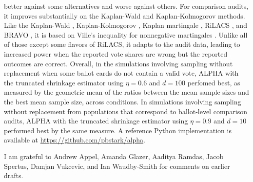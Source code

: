 \documentclass[aoas]{imsart}
\begin{document}
better against some alternatives and worse against others.
For comparison audits, it improves substantially on the Kaplan-Wald and Kaplan-Kolmogorov methods.
Like the Kaplan-Wald \citep{stark09b,stark20}, Kaplan-Kolmogorov \citep{stark20}, Kaplan martingale \citep{starkEvans19,stark20}, 
RiLACS \citep{waudby-smithEtal21}, and BRAVO \citep{lindemanEtal12}, it is based on Ville's inequality for nonnegative martingales \citep{ville39}.
Unlike all of those except some flavors of RiLACS, it adapts to the audit data, leading to increased power when the reported vote shares
are wrong but the reported outcomes are correct.
Overall, in the simulations involving sampling without replacement when some ballot cards do not contain a valid
vote, ALPHA with the truncated shrinkage estimator using $\eta=0.6$ and $d=100$ perfomed best, as measured by the
geometric mean of the ratios between the mean sample sizes and the best mean sample size, across conditions.
In simulations involving sampling without replacement from populations that correspond to ballot-level comparison audits,
ALPHA with the truncated shrinkage estimator using $\eta=0.9$ and $d=10$ performed best by the same measure.
A reference Python implementation is available at \url{https://github.com/pbstark/alpha}.

\begin{acks}[Acknowledgments] 
I am grateful to Andrew Appel, Amanda Glazer, Aaditya Ramdas, Jacob Spertus, Damjan Vukcevic, and Ian Waudby-Smith for comments on earlier drafts.
\end{acks}



\end{document}
